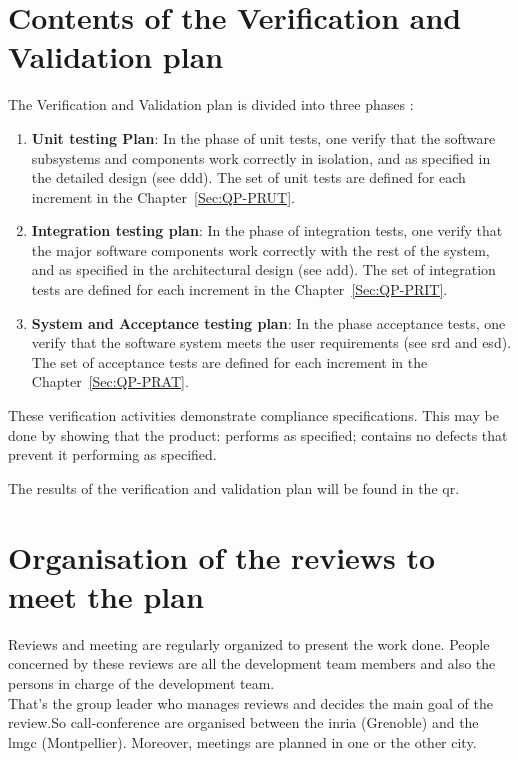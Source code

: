



\begin{changebar}
\section{Contents of the Verification and Validation plan}



The Verification and Validation plan is divided into three phases :
\begin{enumerate}
\item \textbf{Unit testing Plan}: In the phase of unit tests, one  verify that the software subsystems and components work
correctly in isolation, and as specified in the detailed design (see \ac{ddd}). The set of unit tests
  are defined for each increment in the Chapter~\ref{Sec:QP-PRUT}.
\item \textbf{Integration testing plan}: In the phase of
  integration tests, one verify that the major software components
  work correctly with the rest of the system, and as specified in the
  architectural design (see \ac{add}). The set of integration tests
  are defined for each increment in the Chapter~\ref{Sec:QP-PRIT}.
  
\item \textbf{System and Acceptance testing  plan}: In the phase acceptance
  tests, one verify that the software system meets the user
  requirements (see \ac{srd} and \ac{esd}). The set of acceptance
  tests are defined for each increment in the Chapter~\ref{Sec:QP-PRAT}.
\end{enumerate}

These verification activities demonstrate compliance
specifications. This may be done by showing that the product:
performs as specified;
contains no defects that prevent it performing as specified.

The results of the verification and validation plan will be found in
the \ac{qr}.


\section{Organisation of the reviews to meet the plan}
Reviews and meeting are regularly organized to present the work done.
People concerned by these reviews are all the development team members and also the persons in charge of the development team.\\

That's the group leader who manages reviews and decides the main goal of the review.So call-conference are organised between the \ac{inria} (Grenoble) and the \ac{lmgc} (Montpellier). Moreover, meetings are planned in one or the other city.\\


\end{changebar}
